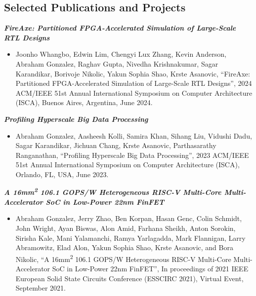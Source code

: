 \documentclass[letter]{res}
\begin{document}
\begin{resume}
\vspace{-2mm}

\section{Selected Publications and Projects}

{\sl \textbf{FireAxe: Partitioned FPGA-Accelerated Simulation of Large-Scale RTL Designs}}\\

 \vspace{-4mm}

\begin{itemize}
 \item Joonho Whangbo, Edwin Lim, Chengyi Lux Zhang, Kevin Anderson, Abraham Gonzalez, Raghav Gupta, Nivedha Krishnakumar, Sagar Karandikar, Borivoje Nikolic, Yakun Sophia Shao, Krste Asanovic, ``FireAxe: Partitioned FPGA-Accelerated Simulation of Large-Scale RTL Designs'', 2024 ACM/IEEE 51st Annual International Symposium on Computer Architecture (ISCA), Buenos Aires, Argentina, June 2024.
\end{itemize}

\vspace{-2mm}

{\sl \textbf{Profiling Hyperscale Big Data Processing}}\\

 \vspace{-4mm}

\begin{itemize}
 \item Abraham Gonzalez, Aasheesh Kolli, Samira Khan, Sihang Liu, Vidushi Dadu, Sagar Karandikar, Jichuan Chang, Krste Asanovic, Parthasarathy Ranganathan, ``Profiling Hyperscale Big Data Processing'', 2023 ACM/IEEE 51st Annual International Symposium on Computer Architecture (ISCA), Orlando, FL, USA, June 2023.
\end{itemize}

\vspace{-2mm}

{\sl \textbf{A 16mm\textsuperscript{2} 106.1 GOPS/W Heterogeneous RISC-V Multi-Core Multi-Accelerator SoC in Low-Power 22nm FinFET}}\\

 \vspace{-4mm}

\begin{itemize}
 \item Abraham Gonzalez, Jerry Zhao, Ben Korpan, Hasan Genc, Colin Schmidt, John Wright, Ayan Biswas, Alon Amid, Farhana Sheikh, Anton Sorokin, Sirisha Kale, Mani Yalamanchi, Ramya Yarlagadda, Mark Flannigan, Larry Abramowitz, Elad Alon, Yakun Sophia Shao, Krste Asanovic, and Bora Nikolic, ``A 16mm\textsuperscript{2} 106.1 GOPS/W Heterogeneous RISC-V Multi-Core Multi-Accelerator SoC in Low-Power 22nm FinFET'', In proceedings of 2021 IEEE European Solid State Circuits Conference (ESSCIRC 2021), Virtual Event, September 2021.
\end{itemize}


\end{resume}
\end{document}
